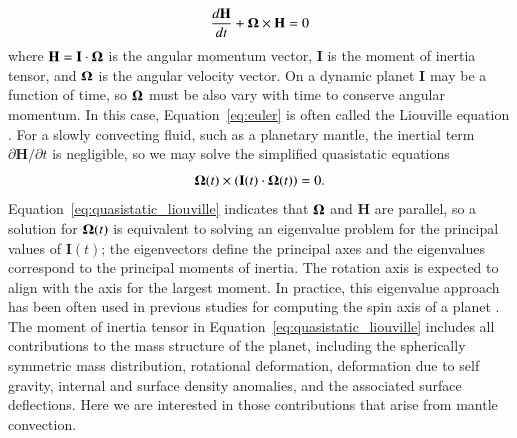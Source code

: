 \documentclass[preprint,12pt,authoryear]{elsarticle}
\newcommand{\mitbf}[1]{\hbox{\mathversion{bold}$#1$}}
\begin{document}
\begin{equation}
\frac{d \mathbf{H}}{dt} + \mitbf{\Omega} \times \mathbf{H} = 0
\label{eq:euler}
\end{equation}
where $\mathbf{H} = \mathbf{I} \cdot \mitbf{\Omega}$ is the angular momentum vector, $\mathbf{I}$ is the moment of inertia tensor, and $\mitbf{\Omega}$ is the angular velocity vector.
On a dynamic planet $\mathbf{I}$ may be a function of time, so $\mitbf{\Omega}$ must be also vary with time to conserve angular momentum.
In this case, Equation~\eqref{eq:euler} is often called the Liouville equation \citep[e.g.][]{munk1960rotation}.
For a slowly convecting fluid, such as a planetary mantle, the inertial term $\partial \mathbf{H} / \partial t$ is negligible, so we may solve the simplified quasistatic equations
\begin{equation}
\mitbf{\Omega } (t)\times ( \mathbf{I}(t) \cdot \mitbf{\Omega }(t) ) = 0.
\label{eq:quasistatic_liouville}
\end{equation}
Equation~\eqref{eq:quasistatic_liouville} indicates that $\mitbf{\Omega}$ and $\mathbf{H}$ are parallel, so a solution for $\mitbf{\Omega}(t)$ is equivalent to solving an eigenvalue problem for the principal values of $\mathbf{I}(t)$;  the eigenvectors define the principal axes and the eigenvalues correspond to the principal moments of inertia. The rotation axis is expected to align with the axis for the largest moment.  
In practice, this eigenvalue approach has been often used in previous studies for computing the spin axis of a planet \citep[e.g.][]{steinberger1997changes, roberts2007cause}.
The moment of inertia tensor in Equation~\eqref{eq:quasistatic_liouville} includes all contributions to the mass structure
of the planet, including the spherically symmetric mass distribution, rotational deformation, deformation due to self gravity, internal and surface density anomalies, and the associated surface deflections.
Here we are interested in those contributions that arise from mantle convection.
\end{document}
